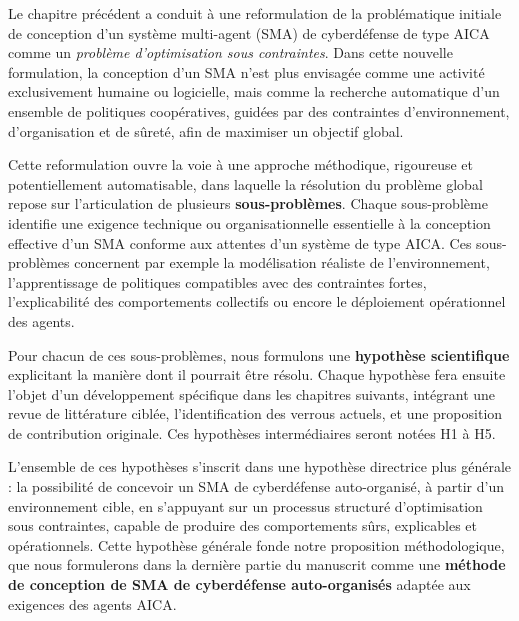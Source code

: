 \documentclass[ twoside,openright,titlepage,numbers=noenddot,headinclude,%
                footinclude=true,cleardoublepage=empty,abstractoff, %
                BCOR=5mm,paper=a4,fontsize=11pt,%
                french,american,%
                ]{scrreprt}
\begin{document}

Le chapitre précédent a conduit à une reformulation de la problématique initiale de conception d'un système multi-agent (SMA) de cyberdéfense de type AICA comme un \textit{problème d'optimisation sous contraintes}. Dans cette nouvelle formulation, la conception d'un SMA n'est plus envisagée comme une activité exclusivement humaine ou logicielle, mais comme la recherche automatique d'un ensemble de politiques coopératives, guidées par des contraintes d'environnement, d'organisation et de sûreté, afin de maximiser un objectif global.

Cette reformulation ouvre la voie à une approche méthodique, rigoureuse et potentiellement automatisable, dans laquelle la résolution du problème global repose sur l'articulation de plusieurs \textbf{sous-problèmes}. Chaque sous-problème identifie une exigence technique ou organisationnelle essentielle à la conception effective d'un SMA conforme aux attentes d'un système de type AICA. Ces sous-problèmes concernent par exemple la modélisation réaliste de l'environnement, l'apprentissage de politiques compatibles avec des contraintes fortes, l'explicabilité des comportements collectifs ou encore le déploiement opérationnel des agents.

Pour chacun de ces sous-problèmes, nous formulons une \textbf{hypothèse scientifique} explicitant la manière dont il pourrait être résolu. Chaque hypothèse fera ensuite l'objet d'un développement spécifique dans les chapitres suivants, intégrant une revue de littérature ciblée, l'identification des verrous actuels, et une proposition de contribution originale. Ces hypothèses intermédiaires seront notées H1 à H5.

L'ensemble de ces hypothèses s'inscrit dans une hypothèse directrice plus générale : la possibilité de concevoir un SMA de cyberdéfense auto-organisé, à partir d'un environnement cible, en s'appuyant sur un processus structuré d'optimisation sous contraintes, capable de produire des comportements sûrs, explicables et opérationnels. Cette hypothèse générale fonde notre proposition méthodologique, que nous formulerons dans la dernière partie du manuscrit comme une \textbf{méthode de conception de SMA de cyberdéfense auto-organisés} adaptée aux exigences des agents AICA.
\end{document}
